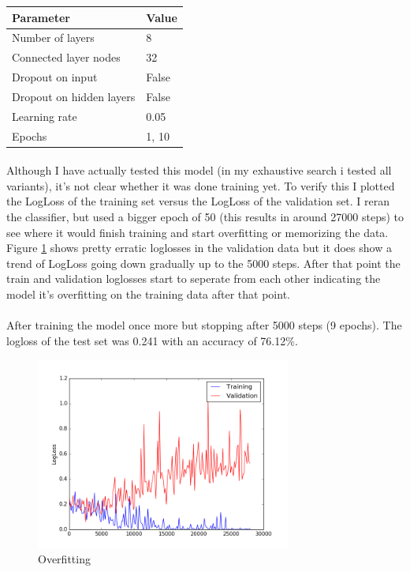 \documentclass[11pt]{article}
\begin{document}
\begin{tabular}{|l | l|}
	\hline
	Parameter & Value\\
	\hline
	Number of layers & 8\\
	Connected layer nodes & 32\\
	Dropout on input & False\\
	Dropout on hidden layers & False\\
	Learning rate & 0.05\\
	Epochs & 1, 10\\
	\hline
\end{tabular}

\paragraph{} Although I have actually tested this model (in my exhaustive search i tested all variants), it's not clear whether it was done training yet. To verify this I plotted the LogLoss of the training set versus the LogLoss of the validation set. I reran the classifier, but used a bigger epoch of 50 (this results in around 27000 steps) to see where it would finish training and start overfitting or memorizing the data. Figure \ref{fig:overfitting} shows pretty erratic loglosses in the validation data but it does show a trend of LogLoss going down gradually up to the 5000 steps. After that point the train and validation loglosses start to seperate from each other indicating the model it's overfitting on the training data after that point.

\paragraph{} After training the model once more but stopping after 5000 steps (9 epochs). The logloss of the test set was 0.241 with an accuracy of 76.12\%.

\begin{figure}
    \centering
    \includegraphics[width=0.75\textwidth]{images/overfitting}
    \caption{Overfitting}
    \label{fig:overfitting}
\end{figure}
\end{document}
